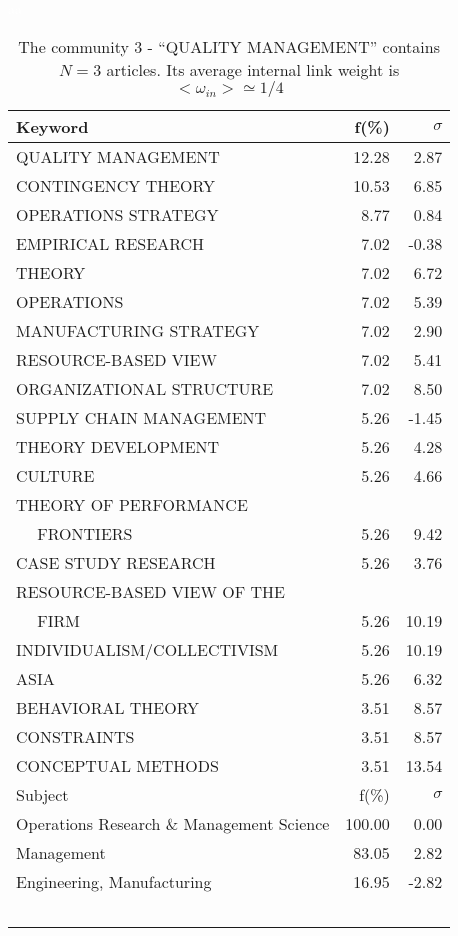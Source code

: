 \documentclass[a4paper,11pt]{report}
\begin{document}
\begin{landscape}
\begin{table}[!ht]
\caption{The community 3 - ``QUALITY MANAGEMENT'' contains $N = 3$ articles. Its average internal link weight is $<\omega_{in}> \simeq 1/4$ }
\textcolor{white}{aa}\\
{\scriptsize\begin{tabular}{|l r r|}
\hline
Keyword & f(\%) & $\sigma$\\
\hline
QUALITY MANAGEMENT & 12.28 & 2.87\\
CONTINGENCY THEORY & 10.53 & 6.85\\
OPERATIONS STRATEGY & 8.77 & 0.84\\
EMPIRICAL RESEARCH & 7.02 & -0.38\\
THEORY & 7.02 & 6.72\\
OPERATIONS & 7.02 & 5.39\\
MANUFACTURING STRATEGY & 7.02 & 2.90\\
RESOURCE-BASED VIEW & 7.02 & 5.41\\
ORGANIZATIONAL STRUCTURE & 7.02 & 8.50\\
SUPPLY CHAIN MANAGEMENT & 5.26 & -1.45\\
THEORY DEVELOPMENT & 5.26 & 4.28\\
CULTURE & 5.26 & 4.66\\
THEORY OF PERFORMANCE &  & \\
$\quad$ FRONTIERS & 5.26 & 9.42\\
CASE STUDY RESEARCH & 5.26 & 3.76\\
RESOURCE-BASED VIEW OF THE &  & \\
$\quad$ FIRM & 5.26 & 10.19\\
INDIVIDUALISM/COLLECTIVISM & 5.26 & 10.19\\
ASIA & 5.26 & 6.32\\
BEHAVIORAL THEORY & 3.51 & 8.57\\
CONSTRAINTS & 3.51 & 8.57\\
CONCEPTUAL METHODS & 3.51 & 13.54\\
\hline
\hline
Subject & f(\%) & $\sigma$\\
\hline
Operations Research \& Management Science & 100.00 & 0.00\\
Management & 83.05 & 2.82\\
Engineering, Manufacturing & 16.95 & -2.82\\
 &  & \\
 &  & \\
 &  & \\
 &  & \\
 &  & \\

\end{tabular}}
\end{table}
\end{landscape}
\end{document}
